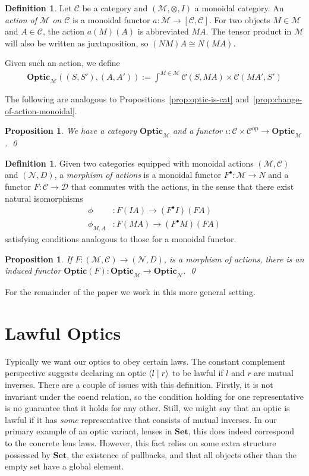 \documentclass[11pt,letterpaper]{article}
\theoremstyle{plain}
\newtheorem{proposition}[theorem]{Proposition}
\theoremstyle{definition}
\newtheorem{definition}[theorem]{Definition}
\newcommand{\C}{\mathscr{C}}
\newcommand{\D}{\mathscr{D}}
\newcommand{\M}{\mathscr{M}}
\newcommand{\N}{\mathscr{N}}
\newcommand{\Set}{\mathbf{Set}}
\newcommand{\Optic}{\mathbf{Optic}}
\newcommand{\op}{\mathrm{op}}
\newcommand{\rep}[2]{{\ensuremath \left\langle #1 \mid #2 \right\rangle}}
\begin{document}
\begin{definition}
  Let $\C$ be a category and $(\M, \otimes, I)$ a monoidal category. An \emph{action of $\M$ on $\C$} is a monoidal functor $a : \M \to [\C, \C]$. For two objects $M \in \M$ and $A \in \C$, the action $a(M)(A)$ is abbreviated $MA$. The tensor product in $\M$ will also be written as juxtaposition, so $(NM)A \cong N(MA)$.
\end{definition}

Given such an action, we define
\begin{align*}
  \Optic_\M((S, S'), (A, A')) := \int^{M \in \M} \C(S, MA) \times \C(MA', S')
\end{align*}

The following are analogous to Propositions~\ref{prop:optic-is-cat} and~\ref{prop:change-of-action-monoidal}.

\begin{proposition}
  We have a category $\Optic_\M$ and a functor $\iota : \C \times \C^\op \to \Optic_\M$. \qed
\end{proposition}

\begin{definition}
Given two categories equipped with monoidal actions $(\M, \C)$ and $(\N, D)$, a \emph{morphism of actions} is a monoidal functor $F^\bullet : \M \to N$ and a functor $F : \C \to \D$ that commutes with the actions, in the sense that there exist natural isomorphisms
  \begin{align*}
  \phi &: F(I A) \to (F^\bullet I)(FA) \\
  \phi_{M,A} &: F(MA) \to (F^\bullet M)(F A)
  \end{align*}
satisfying conditions analogous to those for a monoidal functor.
\end{definition}

\begin{proposition}\label{prop:change-of-action}
If $F : (\M, \C) \to (\N, D)$, is a morphism of actions, there is an induced functor $\Optic(F) : \Optic_\M \to \Optic_\N$. \qed
\end{proposition}

For the remainder of the paper we work in this more general setting.

\section{Lawful Optics}\label{sec:lawful-optics}
Typically we want our optics to obey certain laws. The constant complement perspective suggests declaring an optic $\rep{l}{r}$ to be lawful if $l$ and $r$ are mutual inverses. There are a couple of issues with this definition. Firstly, it is not invariant under the coend relation, so the condition holding for one representative is no guarantee that it holds for any other. Still, we might say that an optic is lawful if it has \emph{some} representative that consists of mutual inverses. In our primary example of an optic variant, lenses in $\Set$, this does indeed correspond to the concrete lens laws. However, this fact relies on some extra structure possessed by $\Set$, the existence of pullbacks, and that all objects other than the empty set have a global element.
\end{document}

